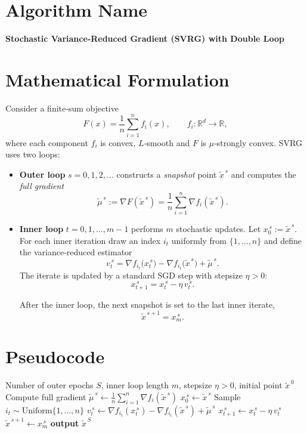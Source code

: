 \documentclass{article}
\begin{document}
\section*{Algorithm Name}
\textbf{Stochastic Variance‑Reduced Gradient (SVRG) with Double Loop}

\section*{Mathematical Formulation}
Consider a finite‑sum objective
\[
F(x)=\frac{1}{n}\sum_{i=1}^{n}f_i(x),\qquad f_i:\mathbb{R}^{d}\rightarrow\mathbb{R},
\]
where each component $f_i$ is convex, $L$‑smooth and $F$ is $\mu$‑strongly convex.  
SVRG uses two loops:

\begin{itemize}
\item \textbf{Outer loop} $s=0,1,2,\dots$ constructs a \emph{snapshot} point $\tilde{x}^{\,s}$ and computes the \emph{full gradient}
\[
\tilde{\mu}^{\,s}:=\nabla F(\tilde{x}^{\,s})=\frac{1}{n}\sum_{i=1}^{n}\nabla f_i(\tilde{x}^{\,s}).
\]

\item \textbf{Inner loop} $t=0,1,\dots,m-1$ performs $m$ stochastic updates.  
Let $x_{0}^{\,s}:=\tilde{x}^{\,s}$. For each inner iteration draw an index $i_t$ uniformly from $\{1,\dots,n\}$ and define the variance‑reduced estimator
\[
v_t^{\,s}= \nabla f_{i_t}\!\bigl(x_{t}^{\,s}\bigr)-\nabla f_{i_t}\!\bigl(\tilde{x}^{\,s}\bigr)+\tilde{\mu}^{\,s}.
\]
The iterate is updated by a standard SGD step with stepsize $\eta>0$:
\[
x_{t+1}^{\,s}=x_{t}^{\,s}-\eta\,v_t^{\,s}.
\]

After the inner loop, the next snapshot is set to the last inner iterate,
\[
\tilde{x}^{\,s+1}=x_{m}^{\,s}.
\]
\end{itemize}

\section*{Pseudocode}
\begin{algorithm}[H]
\caption{SVRG}
\begin{algorithmic}[1]
\Require Number of outer epochs $S$, inner loop length $m$, stepsize $\eta>0$, initial point $\tilde{x}^{\,0}$
    \State Compute full gradient $\displaystyle \tilde{\mu}^{\,s}\gets\frac{1}{n}\sum_{i=1}^{n}\nabla f_i(\tilde{x}^{\,s})$
    \State $x_{0}^{\,s}\gets\tilde{x}^{\,s}$
        \State Sample $i_t\sim\text{Uniform}\{1,\dots,n\}$
        \State $v_t^{\,s}\gets \nabla f_{i_t}(x_{t}^{\,s})-\nabla f_{i_t}(\tilde{x}^{\,s})+\tilde{\mu}^{\,s}$
        \State $x_{t+1}^{\,s}\gets x_{t}^{\,s}-\eta\,v_t^{\,s}$
    \EndFor
    \State $\tilde{x}^{\,s+1}\gets x_{m}^{\,s}$
\EndFor
\State \textbf{output} $\tilde{x}^{\,S}$
\end{algorithmic}
\end{algorithm}
\end{document}
